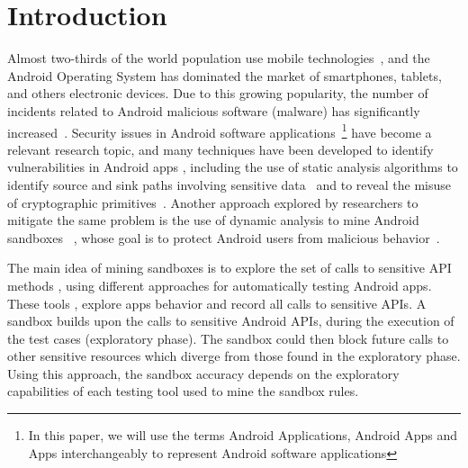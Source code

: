 \section{Introduction}

Almost two-thirds of the world population use mobile technologies~\cite{Comscore}, and the Android Operating System has dominated the market of smartphones, tablets, and others electronic devices. Due to this growing popularity, the number of incidents related to Android malicious software (malware) has significantly increased~\cite{DBLP:journals/comsur/FarukiBLGGCR15,DBLP:journals/csur/SufatrioTCT15}. Security issues in Android software applications~\footnote{In this paper, we will use the terms Android Applications, Android Apps and Apps interchangeably to represent Android software applications} have become a relevant research topic, and many techniques have been developed to identify vulnerabilities in Android apps \cite{DBLP:conf/pldi/ArztRFBBKTOM14}, including the use of static analysis algorithms to identify source and sink paths involving sensitive data~\cite{DBLP:conf/pldi/ArztRFBBKTOM14}  and to reveal the misuse of cryptographic primitives~\cite{krueger:ecoop-2018,rahaman:ccs-2019}. Another approach explored by researchers to mitigate the same problem is the use of dynamic analysis to mine Android sandboxes~ , whose goal is to protect Android users from malicious behavior~\cite{DBLP:conf/icse/JamrozikSZ16}.

The main idea of mining sandboxes is to explore the set of calls to sensitive API methods , using different approaches for automatically testing Android apps. These tools , explore apps behavior and record all calls to sensitive APIs. A sandbox builds upon the calls to sensitive Android APIs, during the execution of the test cases (exploratory phase). The sandbox could then block future calls to other sensitive resources which diverge from those found in the exploratory phase. Using this approach, the sandbox accuracy depends on the exploratory capabilities of each testing tool used to mine the sandbox rules. 
  
